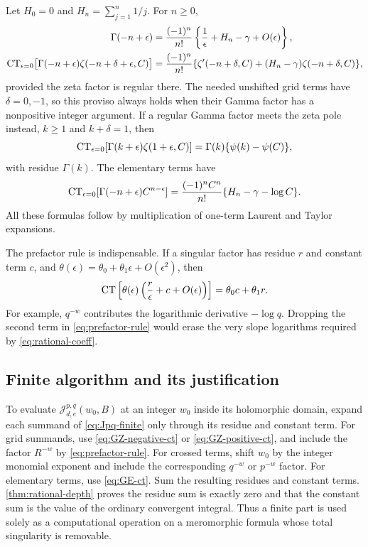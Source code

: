 Let $H_0=0$ and $H_n=\sum_{j=1}^n1/j$. For $n\ge0$,
\begin{align}
 \Gamma(-n+\epsilon)
  &=\frac{(-1)^n}{n!}
     \left\{\frac1\epsilon+H_n-\gamma+O(\epsilon)\right\},
                                 \label{eq:Gamma-laurent}\\
 \operatorname{CT}_{\epsilon=0}\bigl[\Gamma(-n+\epsilon)
                    \zeta(-n+\delta+\epsilon,C)\bigr]
  &=\frac{(-1)^n}{n!}
    \{\zeta'(-n+\delta,C)+(H_n-\gamma)\zeta(-n+\delta,C)\},
                                 \label{eq:GZ-negative-ct}
\end{align}
provided the zeta factor is regular there. The needed unshifted grid
terms have $\delta=0,-1$, so this proviso always holds when their Gamma
factor has a nonpositive integer argument. If a regular Gamma factor
meets the zeta pole instead, $k\ge1$ and $k+\delta=1$, then
\begin{equation}\label{eq:GZ-positive-ct}
 \operatorname{CT}_{\epsilon=0}[\Gamma(k+\epsilon)\zeta(1+\epsilon,C)]
       =\Gamma(k)\{\psi(k)-\psi(C)\},
\end{equation}
with residue $\Gamma(k)$. The elementary terms have
\begin{equation}\label{eq:GE-ct}
 \operatorname{CT}_{\epsilon=0}[\Gamma(-n+\epsilon)C^{n-\epsilon}]
       =\frac{(-1)^nC^n}{n!}\{H_n-\gamma-\log C\}.
\end{equation}
All these formulas follow by multiplication of one-term Laurent and
Taylor expansions.

The prefactor rule is indispensable. If a singular factor has residue
$r$ and constant term $c$, and
$\theta(\epsilon)=\theta_0+\theta_1\epsilon+O(\epsilon^2)$, then
\begin{equation}\label{eq:prefactor-rule}
 \operatorname{CT}\left[\theta(\epsilon)\left(\frac r\epsilon+c+O(\epsilon)\right)\right]
        =\theta_0c+\theta_1r.
\end{equation}
For example, $q^{-w}$ contributes the logarithmic derivative $-\log q$.
Dropping the second term in \eqref{eq:prefactor-rule} would erase the
very slope logarithms required by \eqref{eq:rational-coeff}.

\subsection{Finite algorithm and its justification}
To evaluate $\mathcal J_{d,e}^{p,q}(w_0,B)$ at an integer $w_0$ inside its
holomorphic domain, expand each summand of \eqref{eq:Jpq-finite} only
through its residue and constant term. For grid summands, use
\eqref{eq:GZ-negative-ct} or \eqref{eq:GZ-positive-ct}, and include the
factor $R^{-w}$ by \eqref{eq:prefactor-rule}. For crossed terms, shift
$w_0$ by the integer monomial exponent and include the corresponding
$q^{-w}$ or $p^{-w}$ factor. For elementary terms, use
\eqref{eq:GE-ct}. Sum the resulting residues and constant terms.
\cref{thm:rational-depth} proves the residue sum is exactly zero and
that the constant sum is the value of the ordinary convergent integral.
Thus a finite part is used solely as a computational operation on a
meromorphic formula whose total singularity is removable.

